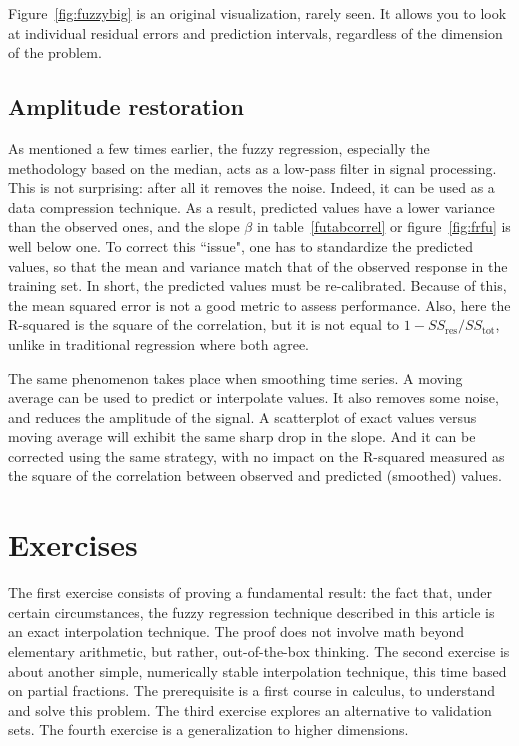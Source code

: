 \documentclass[oneside,10pt]{book}
\begin{document}
Figure~\ref{fig:fuzzybig} is an original visualization, rarely seen. It allows you to look at individual residual errors and prediction intervals, regardless of the dimension of the problem.


\subsection{Amplitude restoration}\label{fpe1stt}

As mentioned a few times earlier, the fuzzy regression, especially the methodology based on the median, acts as a low-pass filter in signal processing. This is not surprising: after all it removes the noise. Indeed, it can be used as a data compression technique. As a result, predicted values have a lower variance than the observed ones, and the slope $\beta$ in table~\ref{futabcorrel} or figure~\ref{fig:frfu} is well below one. To correct this ``issue", one has to standardize the predicted values, so that the mean and variance match that of the observed response in the training set. In short, the predicted values must be re-calibrated. Because of this, the mean squared error is not a good metric to assess performance. Also, here the  R-squared is
the square of the correlation, but it is not equal to $1- SS_{\text{res}}/SS_{\text{tot}}$, unlike in traditional regression where both agree.

The same phenomenon takes place when smoothing time series. A moving average can be used to predict or interpolate values. It also removes some noise, and reduces the amplitude of the signal. A scatterplot of exact values versus moving average will exhibit the same sharp drop in the slope. And it can be corrected using the same strategy, with no impact on the R-squared measured as the square of the correlation between observed and predicted (smoothed) values.



\section{Exercises}

The first exercise consists of proving a fundamental result: the fact that, under certain circumstances,  the fuzzy regression technique described in this article is an exact interpolation
technique. The proof does not involve math beyond elementary arithmetic, but rather, out-of-the-box thinking. The second exercise is about another simple, numerically stable interpolation technique, this time based on partial fractions. The prerequisite is a first course in calculus, to understand and solve this problem. The third exercise explores an alternative to validation sets. The fourth exercise is a generalization to higher dimensions.
\end{document}
